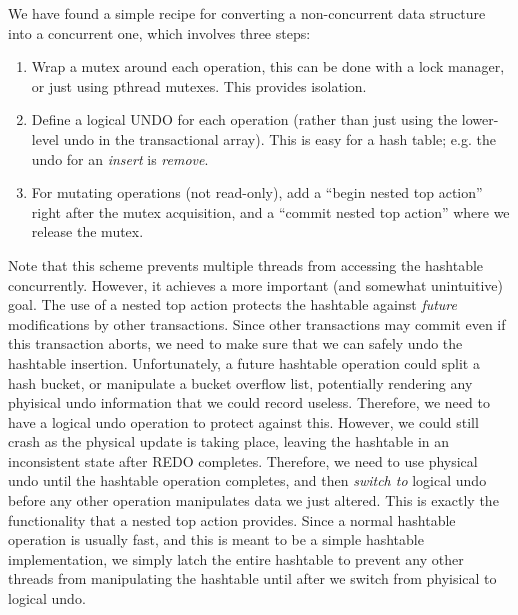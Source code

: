 \documentclass[letterpaper,twocolumn,english]{article}
\newcommand{\eab}[1]{\textcolor{red}{\bf EAB: #1}}
\begin{document}
We have found a simple recipe for converting a non-concurrent data structure into a concurrent one, which involves three steps:
\begin{enumerate}
\item Wrap a mutex around each operation, this can be done with a lock
  manager, or just using pthread mutexes.  This provides isolation.
\item Define a logical UNDO for each operation (rather than just using
  the lower-level undo in the transactional array).  This is easy for a
  hash table; e.g. the undo for an {\em insert} is {\em remove}.
\item For mutating operations (not read-only), add a ``begin nested
  top action'' right after the mutex acquisition, and a ``commit
  nested top action'' where we release the mutex.
\end{enumerate}

Note that this scheme prevents multiple threads from accessing the
hashtable concurrently.  However, it achieves a more important (and
somewhat unintuitive) goal.  The use of a nested top action protects
the hashtable against {\em future} modifications by other
transactions.  Since other transactions may commit even if this
transaction aborts, we need to make sure that we can safely undo the
hashtable insertion.  Unfortunately, a future hashtable operation
could split a hash bucket, or manipulate a bucket overflow list,
potentially rendering any phyisical undo information that we could
record useless.  Therefore, we need to have a logical undo operation
to protect against this.  However, we could still crash as the
physical update is taking place, leaving the hashtable in an
inconsistent state after REDO completes.  Therefore, we need to use
physical undo until the hashtable operation completes, and then {\em
switch to} logical undo before any other operation manipulates data we
just altered.  This is exactly the functionality that a nested top
action provides.  Since a normal hashtable operation is usually fast,
and this is meant to be a simple hashtable implementation, we simply
latch the entire hashtable to prevent any other threads from
manipulating the hashtable until after we switch from phyisical to
logical undo.

\end{document}
